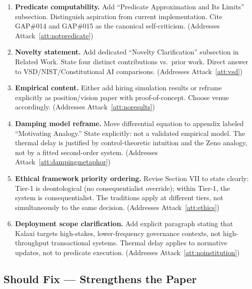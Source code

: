 \documentclass[12pt,a4paper]{article}
\theoremstyle{definition}
\begin{document}
\begin{enumerate}[label=\textbf{M\arabic*.},leftmargin=*]
\item \textbf{Predicate computability.} Add ``Predicate Approximation and Its
  Limits'' subsection. Distinguish aspiration from current implementation.
  Cite GAP\#014 and GAP\#015 as the canonical self-criticism.
  (Addresses Attack~\ref{att:notpredicate})

\item \textbf{Novelty statement.} Add dedicated ``Novelty Clarification''
  subsection in Related Work. State four distinct contributions vs.\ prior
  work. Direct answer to VSD/NIST/Constitutional AI comparisons.
  (Addresses Attack~\ref{att:vsd})

\item \textbf{Empirical content.} Either add hiring simulation results or
  reframe explicitly as position/vision paper with proof-of-concept.
  Choose venue accordingly.
  (Addresses Attack~\ref{att:noresults})

\item \textbf{Damping model reframe.} Move differential equation to appendix
  labeled ``Motivating Analogy.'' State explicitly: not a validated empirical
  model. The thermal delay is justified by control-theoretic intuition and
  the Zeno analogy, not by a fitted second-order system.
  (Addresses Attack~\ref{att:dampingmetaphor})

\item \textbf{Ethical framework priority ordering.} Revise Section VII to
  state clearly: Tier-1 is deontological (no consequentialist override);
  within Tier-1, the system is consequentialist. The traditions apply at
  different tiers, not simultaneously to the same decision.
  (Addresses Attack~\ref{att:ethics})

\item \textbf{Deployment scope clarification.} Add explicit paragraph stating
  that Kalaxi targets high-stakes, lower-frequency governance contexts, not
  high-throughput transactional systems. Thermal delay applies to normative
  updates, not to predicate execution.
  (Addresses Attack~\ref{att:noinstitution})
\end{enumerate}

\subsection*{Should Fix — Strengthens the Paper}
\end{document}
